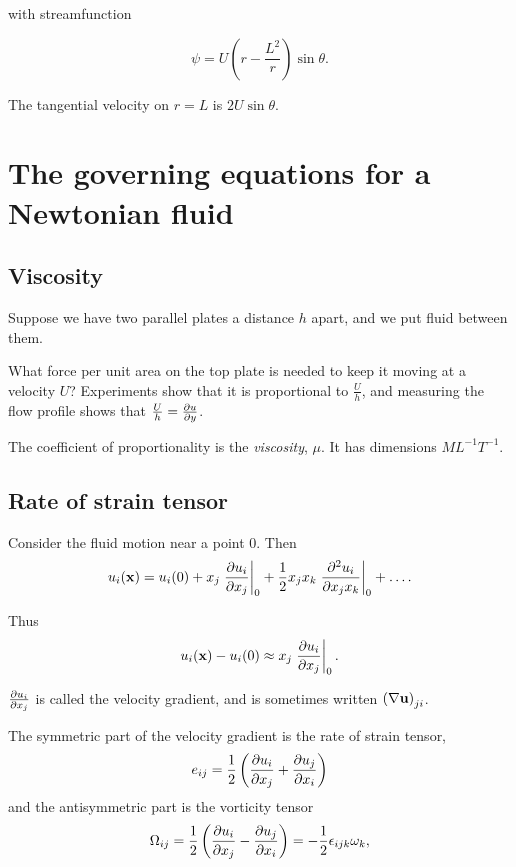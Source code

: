 \documentclass{notes}
\theoremstyle{plain}
\begin{document}
with streamfunction

\begin{equation}\label{eq:circcylstr}
\psi = U \left( r - \frac{L^2}{r} \right) \sin \theta.
\end{equation}

The tangential velocity on $r = L$ is $2 U \sin \theta$.

\chapter[The governing equations]%
{The governing equations for a Newtonian fluid}

\section{Viscosity}

Suppose we have two parallel plates a distance $h$ apart, and we put
fluid between them.

\vspace{1in}

What force per unit area on the top plate is needed to keep it moving
at a velocity $U$?  Experiments show that it is proportional to
$\tfrac{U}{h}$, and measuring the flow profile shows that
$\tfrac{U}{h} = \frac{\partial u}{\partial y}$.

The coefficient of proportionality is the \emph{viscosity}, $\mu$.
It has dimensions $M L^{-1} T^{-1}$.

\section{Rate of strain tensor}

Consider the fluid motion near a point $0$.  Then
\[
u_i(\mathbf{x}) = u_i(0) + x_j \left.\frac{\partial u_i}{\partial x_j}\right|_0
+ \frac{1}{2} x_j x_k \left.\frac{\partial ^2 u_i}{\partial x_j x_k}\right|_0 + \dots.
\]

Thus
\[
u_i(\mathbf{x}) - u_i(0) \approx x_j \left. \frac{\partial u_i}{\partial x_j}\right|_0.
\]

$\frac{\partial u_i}{\partial x_j}$ is called the velocity gradient, and is sometimes written
$\left( \nabla \mathbf{u} \right)_{j i}$.

The symmetric part of the velocity gradient is the rate of strain
tensor,
\begin{equation}\label{eq:rateofstrain}
e_{i j} = \frac{1}{2} \left( \frac{\partial u_i}{\partial x_j} + \frac{\partial u_j}{\partial x_i}\right)
\end{equation}
and the antisymmetric part is the vorticity tensor
\begin{equation}\label{eq:vort}
\Omega_{i j} = \frac{1}{2} \left( \frac{\partial u_i}{\partial x_j} - \frac{\partial u_j}{\partial x_i}\right)
= -\frac{1}{2} \epsilon_{i j k} \omega_k,
\end{equation}
\end{document}
